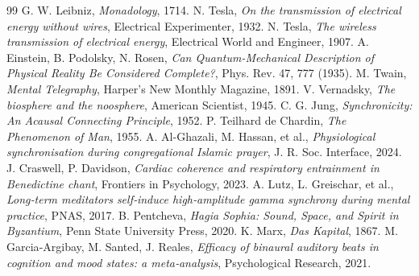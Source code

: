 \documentclass[12pt,a4paper]{article}
\begin{document}
	\begin{thebibliography}{99}
		G. W. Leibniz, \emph{Monadology}, 1714.
		N. Tesla, \emph{On the transmission of electrical energy without wires}, Electrical Experimenter, 1932.
		N. Tesla, \emph{The wireless transmission of electrical energy}, Electrical World and Engineer, 1907.
		A. Einstein, B. Podolsky, N. Rosen, \emph{Can Quantum-Mechanical Description of Physical Reality Be Considered Complete?}, Phys. Rev. 47, 777 (1935).
		M. Twain, \emph{Mental Telegraphy}, Harper's New Monthly Magazine, 1891.
		V. Vernadsky, \emph{The biosphere and the noosphere}, American Scientist, 1945.
		C. G. Jung, \emph{Synchronicity: An Acausal Connecting Principle}, 1952.
		P. Teilhard de Chardin, \emph{The Phenomenon of Man}, 1955.
		A. Al-Ghazali, M. Hassan, et al., \emph{Physiological synchronisation during congregational Islamic prayer}, J. R. Soc. Interface, 2024.
		J. Craswell, P. Davidson, \emph{Cardiac coherence and respiratory entrainment in Benedictine chant}, Frontiers in Psychology, 2023.
		A. Lutz, L. Greischar, et al., \emph{Long‑term meditators self‑induce high‑amplitude gamma synchrony during mental practice}, PNAS, 2017.
		B. Pentcheva, \emph{Hagia Sophia: Sound, Space, and Spirit in Byzantium}, Penn State University Press, 2020.
		K. Marx, \emph{Das Kapital}, 1867.
		M. Garcia‑Argibay, M. Santed, J. Reales, \emph{Efficacy of binaural auditory beats in cognition and mood states: a meta‑analysis}, Psychological Research, 2021.
	\end{thebibliography}
	
\end{document}
